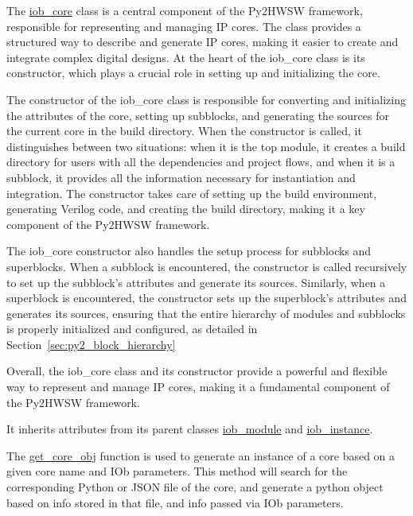 %

The \href{https://github.com/IObundle/py2hwsw/blob/main/py2hwsw/scripts/iob_core.py}{iob\_core} class is a central component of the Py2HWSW framework, responsible for representing and managing IP cores. The class provides a structured way to describe and generate IP cores, making it easier to create and integrate complex digital designs. At the heart of the iob\_core class is its constructor, which plays a crucial role in setting up and initializing the core.

The constructor of the iob\_core class is responsible for converting and initializing the attributes of the core, setting up subblocks, and generating the sources for the current core in the build directory. When the constructor is called, it distinguishes between two situations: when it is the top module, it creates a build directory for users with all the dependencies and project flows, and when it is a subblock, it provides all the information necessary for instantiation and integration. The constructor takes care of setting up the build environment, generating Verilog code, and creating the build directory, making it a key component of the Py2HWSW framework.

The iob\_core constructor also handles the setup process for subblocks and superblocks. When a subblock is encountered, the constructor is called recursively to set up the subblock's attributes and generate its sources. Similarly, when a superblock is encountered, the constructor sets up the superblock's attributes and generates its sources, ensuring that the entire hierarchy of modules and subblocks is properly initialized and configured, as detailed in Section~\ref{sec:py2_block_hierarchy}

Overall, the iob\_core class and its constructor provide a powerful and flexible way to represent and manage IP cores, making it a fundamental component of the Py2HWSW framework.

It inherits attributes from its parent classes \href{https://github.com/IObundle/py2hwsw/blob/main/py2hwsw/scripts/iob_module.py}{iob\_module} and \href{https://github.com/IObundle/py2hwsw/blob/main/py2hwsw/scripts/iob_instance.py}{iob\_instance}.


The \href{https://github.com/IObundle/py2hwsw/blob/main/py2hwsw/scripts/iob_core.py#L858}{get\_core\_obj} function is used to generate an instance of a core based on a given core name and IOb parameters.
This method will search for the corresponding Python or JSON file of the core, and generate a python object based on info stored in that file, and info passed via IOb parameters.

